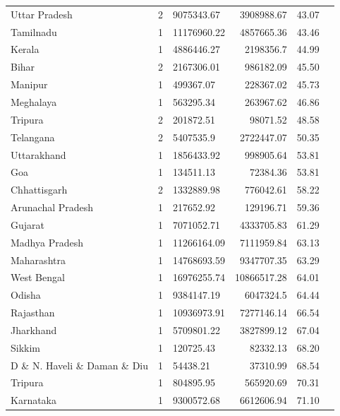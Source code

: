 \documentclass{article}
\begin{document}
\begin{table}[h!]
{\begin{tabular}{|l|l|l|r|r|r|}
			Uttar Pradesh                 & 2  & 9075343.67 & 3908988.67 & 43.07 \\
			Tamilnadu                     & 1  & 11176960.22 & 4857665.36 & 43.46 \\
			Kerala                        & 1  & 4886446.27 & 2198356.7  & 44.99 \\
			Bihar                         & 2  & 2167306.01 & 986182.09  & 45.50 \\
			Manipur                       & 1  & 499367.07  & 228367.02  & 45.73 \\
			Meghalaya                     & 1  & 563295.34  & 263967.62  & 46.86 \\
			Tripura                       & 2  & 201872.51  & 98071.52   & 48.58 \\
			Telangana                     & 2  & 5407535.9  & 2722447.07 & 50.35 \\
			Uttarakhand                   & 1  & 1856433.92 & 998905.64  & 53.81 \\
			Goa                           & 1  & 134511.13  & 72384.36   & 53.81 \\
			Chhattisgarh                  & 2  & 1332889.98 & 776042.61  & 58.22 \\
			Arunachal Pradesh             & 1  & 217652.92  & 129196.71  & 59.36 \\
			Gujarat                        & 1  & 7071052.71 & 4333705.83 & 61.29 \\
			Madhya Pradesh                & 1  & 11266164.09 & 7111959.84 & 63.13 \\
			Maharashtra                   & 1  & 14768693.59 & 9347707.35 & 63.29 \\
			West Bengal                   & 1  & 16976255.74 & 10866517.28 & 64.01 \\
			Odisha                        & 1  & 9384147.19 & 6047324.5  & 64.44 \\
			Rajasthan                     & 1  & 10936973.91 & 7277146.14 & 66.54 \\
			Jharkhand                     & 1  & 5709801.22 & 3827899.12 & 67.04 \\
			Sikkim                        & 1  & 120725.43   & 82332.13   & 68.20 \\
			D \& N. Haveli \& Daman \& Diu & 1  & 54438.21   & 37310.99   & 68.54 \\
			Tripura                       & 1  & 804895.95  & 565920.69  & 70.31 \\
			Karnataka                     & 1  & 9300572.68 & 6612606.94 & 71.10 \\

\end{tabular}}
\end{table}
\end{document}
